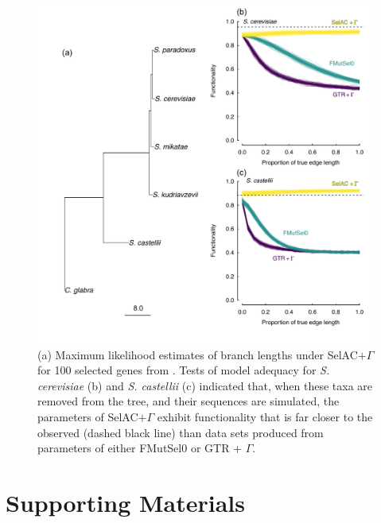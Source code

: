 \documentclass{article}
\newcommand{\selacplusgamma}{SelAC$+\Gamma$\xspace}
\begin{document}
\begin{figure}[H]
  \centering
  \includegraphics[width=0.9\linewidth]{FIGURE_3_Inferred_Tree_AND_Model_Adequacy.pdf}
  \caption{(a) Maximum likelihood estimates of branch lengths under \selacplusgamma for 100 selected genes from \citet{SalichosAndRokas2013}.  
    Tests of model adequacy for \emph{S. cerevisiae} (b) and \emph{S. castellii} (c) indicated that, when these taxa are removed from the tree, and their sequences are simulated, the parameters of \selacplusgamma exhibit functionality that is far closer to the observed (dashed black line) than data sets produced from parameters of either FMutSel0 or GTR + $\Gamma$. 
}
  \label{fig:TreeAndAdequacy}
\end{figure}


\clearpage

\setcounter{figure}{0}
\setcounter{table}{0}
\setcounter{page}{1}
\setcounter{section}{0}

\renewcommand{\thefigure}{S\arabic{figure}}
\renewcommand{\thetable}{S\arabic{table}}
\renewcommand{\thepage}{S\arabic{page}}
\renewcommand{\thesection}{\arabic{section}} %
\renewcommand{\appendixname}{Supporting Materials}
\renewcommand{\theequation}{S\arabic{equation}}

\setcounter{equation}{0}
\appendix
\part*{\appendixname}
\end{document}
